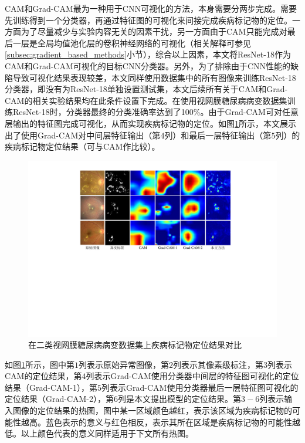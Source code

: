 CAM和Grad-CAM最为一种用于CNN可视化的方法，本身需要分两步完成。需要先训练得到一个分类器，再通过特征图的可视化来间接完成疾病标记物的定位。一方面为了尽量减少与实验内容无关的因素干扰，另一方面由于CAM只能完成对最后一层是全局均值池化层的卷积神经网络的可视化（相关解释可参见\ref{subsec:gradient_based_methods}小节），综合以上因素，本文将ResNet-18作为CAM和Grad-CAM可视化的目标CNN分类器。另外，为了排除由于CNN性能的缺陷导致可视化结果表现较差，本文同样使用数据集中的所有图像来训练ResNet-18分类器，即没有为ResNet-18单独设置测试集，本文后续所有关于CAM和Grad-CAM的相关实验结果均在此条件设置下完成。在使用视网膜糖尿病病变数据集训练ResNet-18时，分类器最终的分类准确率达到了100\%。由于Grad-CAM可对任意层输出的特征图完成可视化，从而实现疾病标记物的定位。如图\ref{fig:retinal_image_res}所示，本文展示出了使用Grad-CAM对中间层特征输出（第$4$列）和最后一层特征输出（第$5$列）的疾病标记物定位结果（可与CAM作比较）。
\begin{figure}[h]
	\centering
	\includegraphics[width=1.0\textwidth]{figure/retinal_image_res.pdf}
	\caption{在二类视网膜糖尿病病变数据集上疾病标记物定位结果对比}
	\label{fig:retinal_image_res}
\end{figure}

如图\ref{fig:retinal_image_res}所示，图中第$1$列表示原始异常图像，第$2$列表示其像素级标注，第$3$列表示CAM的定位结果，第$4$列表示Grad-CAM使用分类器中间层的特征图可视化的定位结果（Grad-CAM-1），第$5$列表示Grad-CAM使用分类器最后一层特征图可视化的定位结果（Grad-CAM-2），第$6$列是本文提出模型的定位结果。第$3-6$列表示输入图像的定位结果的热图，图中某一区域颜色越红，表示该区域为疾病标记物的可能性越高。蓝色表示的意义与红色相反，表示其所在区域是疾病标记物的可能性越低。以上颜色代表的意义同样适用于下文所有热图。

